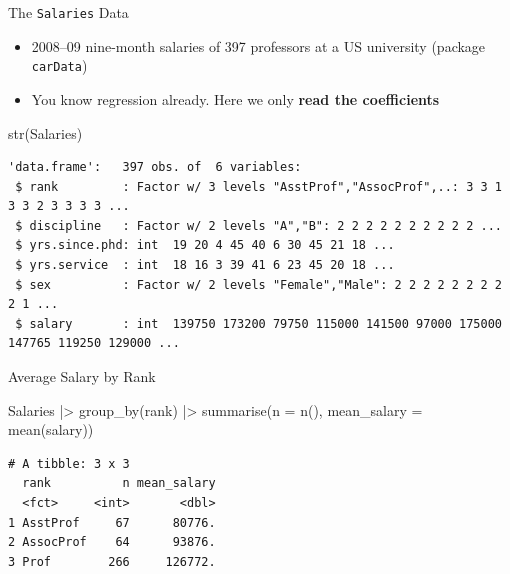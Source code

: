 \documentclass[
  ignorenonframetext,
  aspectratio=169,
]{beamer}
\newenvironment{Shaded}{\begin{snugshade}}{\end{snugshade}}
\newcommand{\AttributeTok}[1]{\textcolor[rgb]{0.40,0.45,0.13}{#1}}
\newcommand{\CommentTok}[1]{\textcolor[rgb]{0.37,0.37,0.37}{#1}}
\newcommand{\FunctionTok}[1]{\textcolor[rgb]{0.28,0.35,0.67}{#1}}
\newcommand{\NormalTok}[1]{\textcolor[rgb]{0.00,0.23,0.31}{#1}}
\newcommand{\OtherTok}[1]{\textcolor[rgb]{0.00,0.23,0.31}{#1}}
\newcommand{\SpecialCharTok}[1]{\textcolor[rgb]{0.37,0.37,0.37}{#1}}
\providecommand{\tightlist}{%
  \setlength{\itemsep}{0pt}\setlength{\parskip}{0pt}}\usepackage{longtable,booktabs,array}
\begin{document}
\begin{frame}[fragile]{The \texttt{Salaries} Data}
\protect\hypertarget{the-salaries-data}{}
\begin{itemize}
\tightlist
\item
  2008--09 nine-month salaries of 397 professors at a US university
  (package \texttt{carData})
\item
  You know regression already. Here we only \textbf{read the
  coefficients}
\end{itemize}

\begin{Shaded}
\begin{Highlighting}[]
\FunctionTok{str}\NormalTok{(Salaries)}
\end{Highlighting}
\end{Shaded}

\begin{verbatim}
'data.frame':   397 obs. of  6 variables:
 $ rank         : Factor w/ 3 levels "AsstProf","AssocProf",..: 3 3 1 3 3 2 3 3 3 3 ...
 $ discipline   : Factor w/ 2 levels "A","B": 2 2 2 2 2 2 2 2 2 2 ...
 $ yrs.since.phd: int  19 20 4 45 40 6 30 45 21 18 ...
 $ yrs.service  : int  18 16 3 39 41 6 23 45 20 18 ...
 $ sex          : Factor w/ 2 levels "Female","Male": 2 2 2 2 2 2 2 2 2 1 ...
 $ salary       : int  139750 173200 79750 115000 141500 97000 175000 147765 119250 129000 ...
\end{verbatim}
\end{frame}

\begin{frame}[fragile]{Average Salary by Rank}
\protect\hypertarget{average-salary-by-rank}{}
\begin{Shaded}
\begin{Highlighting}[]
\NormalTok{Salaries }\SpecialCharTok{|\textgreater{}}
  \FunctionTok{group\_by}\NormalTok{(rank) }\SpecialCharTok{|\textgreater{}}
  \FunctionTok{summarise}\NormalTok{(}\AttributeTok{n =} \FunctionTok{n}\NormalTok{(), }\AttributeTok{mean\_salary =} \FunctionTok{mean}\NormalTok{(salary))}
\end{Highlighting}
\end{Shaded}

\begin{verbatim}
# A tibble: 3 x 3
  rank          n mean_salary
  <fct>     <int>       <dbl>
1 AsstProf     67      80776.
2 AssocProf    64      93876.
3 Prof        266     126772.
\end{verbatim}

\begin{Shaded}
\end{Shaded}
\end{frame}
\end{document}
